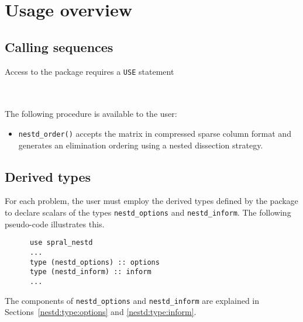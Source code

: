 
\section{Usage overview}

\subsection{Calling sequences}

Access to the package requires a {\tt USE} statement \\ \\
\indent\hspace{8mm}{\tt use spral\_nestd} \\

\medskip

\noindent
The following procedure is available to the user:
\begin{itemize}
\item {\tt nestd\_order()} accepts the  
matrix in compressed sparse column format and generates an elimination ordering 
using a nested dissection strategy.


\end{itemize}



\subsection{Derived types}

For each problem, the user must employ the derived types defined by the
package to declare scalars of the types
{\tt nestd\_options} and {\tt nestd\_inform}.
The following pseudo-code illustrates this.
\begin{verbatim}
      use spral_nestd
      ...
      type (nestd_options) :: options
      type (nestd_inform) :: inform
      ...
\end{verbatim}
The components of {\tt nestd\_options} and {\tt nestd\_inform} are explained
in Sections~\ref{nestd:type:options} and \ref{nestd:type:inform}.



